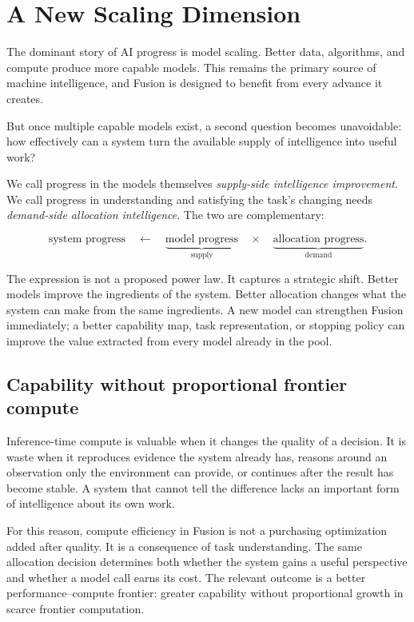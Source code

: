\section{A New Scaling Dimension}

The dominant story of AI progress is model scaling. Better data, algorithms,
and compute produce more capable models. This remains the primary source of
machine intelligence, and Fusion is designed to benefit from every advance it
creates.

But once multiple capable models exist, a second question becomes unavoidable:
how effectively can a system turn the available supply of intelligence into
useful work?

We call progress in the models themselves \emph{supply-side intelligence
improvement}. We call progress in understanding and satisfying the task's
changing needs \emph{demand-side allocation intelligence}. The two are
complementary:

\begin{equation}
  \text{system progress}
  \quad\longleftarrow\quad
  \underbrace{\text{model progress}}_{\text{supply}}
  \quad\times\quad
  \underbrace{\text{allocation progress}}_{\text{demand}}.
\end{equation}

The expression is not a proposed power law. It captures a strategic shift.
Better models improve the ingredients of the system. Better allocation changes
what the system can make from the same ingredients. A new model can strengthen
Fusion immediately; a better capability map, task representation, or stopping
policy can improve the value extracted from every model already in the pool.

\subsection{Capability without proportional frontier compute}

Inference-time compute is valuable when it changes the quality of a decision.
It is waste when it reproduces evidence the system already has, reasons around
an observation only the environment can provide, or continues after the result
has become stable. A system that cannot tell the difference lacks an important
form of intelligence about its own work.

For this reason, compute efficiency in Fusion is not a purchasing optimization
added after quality. It is a consequence of task understanding. The same
allocation decision determines both whether the system gains a useful
perspective and whether a model call earns its cost. The relevant outcome is a
better performance--compute frontier: greater capability without proportional
growth in scarce frontier computation.

